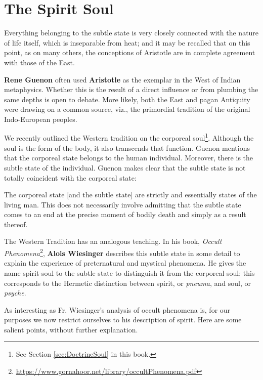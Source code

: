 \section{The Spirit Soul}

\begin{quotex}
Everything belonging to the subtle state is very closely connected with the nature of life itself, which is inseparable from heat; and it may be recalled that on this point, as on many others, the conceptions of Aristotle are in complete agreement with those of the East. 

\end{quotex}
\textbf{Rene Guenon} often used \textbf{Aristotle} as the exemplar in the West of Indian metaphysics. Whether this is the result of a direct influence or from plumbing the same depths is open to debate. More likely, both the East and pagan Antiquity were drawing on a common source, viz., the primordial tradition of the original Indo-European peoples.

We recently outlined the Western tradition on the corporeal soul\footnote{See Section \ref{sec:DoctrineSoul} in this book.}. Although the soul is the form of the body, it also transcends that function. Guenon mentions that the corporeal state belongs to the human individual. Moreover, there is the subtle state of the individual. Guenon makes clear that the subtle state is not totally coincident with the corporeal state:

\begin{quotex}
The corporeal state [and the subtle state] are strictly and essentially states of the living man. This does not necessarily involve admitting that the subtle state comes to an end at the precise moment of bodily death and simply as a result thereof. 

\end{quotex}
The Western Tradition has an analogous teaching. In his book, \textit{Occult Phenomena}\footnote{\url{https://www.gornahoor.net/library/occultPhenomena.pdf}}, \textbf{Alois Wiesinger} describes this subtle state in some detail to explain the experience of preternatural and mystical phenomena. He gives the name spirit-soul to the subtle state to distinguish it from the corporeal soul; this corresponds to the Hermetic distinction between spirit, or \emph{pneuma}, and soul, or \emph{psyche}.

As interesting as Fr. Wiesinger's analysis of occult phenomena is, for our purposes we now restrict ourselves to his description of spirit. Here are some salient points, without further explanation.

